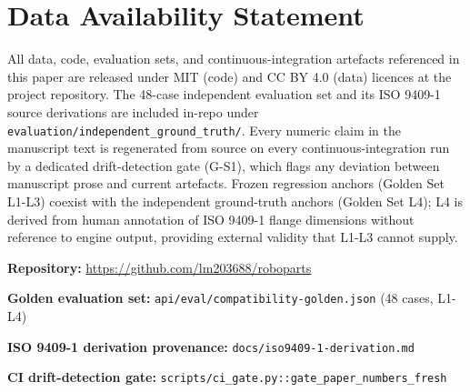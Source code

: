 \documentclass[11pt]{article}
\begin{document}
\section*{Data Availability Statement}

\noindent All data, code, evaluation sets, and continuous-integration artefacts referenced in this paper are released under MIT (code) and CC BY 4.0 (data) licences at the project repository. The 48-case independent evaluation set and its ISO 9409-1 source derivations are included in-repo under \texttt{evaluation/independent\_ground\_truth/}. Every numeric claim in the manuscript text is regenerated from source on every continuous-integration run by a dedicated drift-detection gate (G-S1), which flags any deviation between manuscript prose and current artefacts. Frozen regression anchors (Golden Set L1-L3) coexist with the independent ground-truth anchors (Golden Set L4); L4 is derived from human annotation of ISO 9409-1 flange dimensions without reference to engine output, providing external validity that L1-L3 cannot supply.

\vspace{1.5em}

\noindent\textbf{Repository:} \url{https://github.com/lm203688/roboparts}

\noindent\textbf{Golden evaluation set:} \texttt{api/eval/compatibility-golden.json} (48 cases, L1-L4)

\noindent\textbf{ISO 9409-1 derivation provenance:} \texttt{docs/iso9409-1-derivation.md}

\noindent\textbf{CI drift-detection gate:} \texttt{scripts/ci_gate.py::gate\_paper\_numbers\_fresh}
\end{document}
